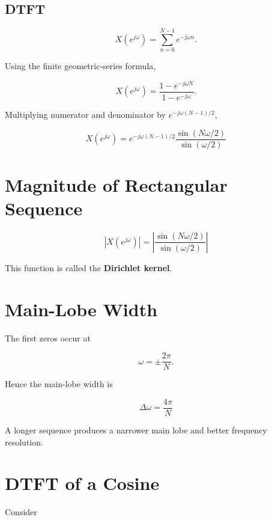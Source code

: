 
\subsection{DTFT}

\[
X(e^{j\omega})=
\sum_{n=0}^{N-1}e^{-j\omega n}.
\]

Using the finite geometric-series formula,

\[
X(e^{j\omega})=
\frac{1-e^{-j\omega N}}{1-e^{-j\omega}}.
\]

Multiplying numerator and denominator by \(e^{-j\omega(N-1)/2}\),

\[
\boxed{
X(e^{j\omega})=
e^{-j\omega(N-1)/2}
\frac{\sin(N\omega/2)}{\sin(\omega/2)}
}
\]


\section{Magnitude of Rectangular Sequence}

\[
\boxed{
|X(e^{j\omega})|=
\left|
\frac{\sin(N\omega/2)}{\sin(\omega/2)}
\right|
}
\]

This function is called the \textbf{Dirichlet kernel}.


\section{Main-Lobe Width}

The first zeros occur at

\[
\omega=\pm\frac{2\pi}{N}.
\]

Hence the main-lobe width is

\[
\boxed{
\Delta\omega=\frac{4\pi}{N}
}
\]

A longer sequence produces a narrower main lobe and better frequency resolution.


\section{DTFT of a Cosine}

Consider

